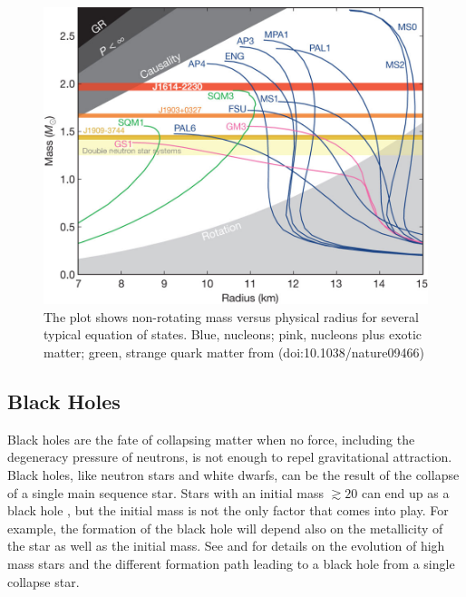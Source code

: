 \begin{figure}[]
        \centering
\includegraphics[scale=.3]{assets/images/es.jpg}
\caption{The plot shows non-rotating mass versus physical radius for several typical equation of states.  Blue, nucleons; pink, nucleons plus exotic matter; green, strange quark matter from (doi:10.1038/nature09466)}
\label{fig:nsmod}
\end{figure}


\subsection{Black Holes}\label{sec:bh}

Black holes are the fate of collapsing matter when no force, including the degeneracy pressure of neutrons, is not enough to repel gravitational attraction. Black holes,  like neutron stars and white dwarfs, can be the result of the collapse of a single main sequence star. Stars with an initial mass $\gtrsim  20$ can end up as a black hole \citep{heger_how_2003}, but the initial mass is not the only factor that comes into play. For example, the formation of the black hole will depend also on the metallicity of the star as well as the initial mass. See \cite{heger_how_2003} and \citep{brown_evolution_2000} for details on the evolution of high mass stars and the different formation path leading to a black hole from a single collapse star. 

